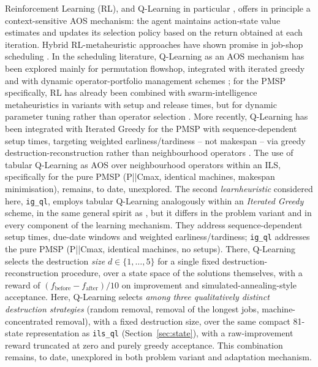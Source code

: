 \documentclass[final,3p,times,11pt,authoryear]{elsarticle}
\begin{document}
Reinforcement Learning (RL), and Q-Learning in particular
\citep{WatkinsDayan1992,SuttonBarto2018}, offers in principle a
context-sensitive AOS mechanism: the agent maintains action-state value estimates and
updates its selection policy based on the return obtained at each
iteration.
Hybrid RL-metaheuristic approaches have shown promise in job-shop
scheduling \citep{ParkEtal2021}. In the scheduling literature, Q-Learning as an
AOS mechanism has been explored mainly for permutation flowshop,
integrated with iterated greedy \citep{KarimiMamaghanEtal2023} and with
dynamic operator-portfolio management schemes
\citep{KarimiMamaghanEtal2024}; for the PMSP specifically, RL has
already been combined with swarm-intelligence metaheuristics in
variants with setup and release times, but for dynamic parameter
tuning rather than operator selection \citep{Ozsoydan2025}. More
recently, Q-Learning has been integrated with
Iterated Greedy for the PMSP with sequence-dependent setup times,
targeting weighted earliness/tardiness -- not makespan -- via greedy
destruction-reconstruction rather than neighbourhood operators
\citep{MissaouiOSullivan2026}. The use of tabular Q-Learning as AOS
over neighbourhood operators within an ILS, specifically for the pure
PMSP (P||Cmax, identical machines, makespan minimisation), remains, to
date, unexplored.
The second \emph{learnheuristic} considered here, \texttt{ig\_ql}, employs
tabular Q-Learning analogously within an \emph{Iterated Greedy} scheme,
in the same general spirit as \citet{MissaouiOSullivan2026}, but it
differs in the problem variant and in every component of the learning
mechanism. They address sequence-dependent setup times, due-date windows
and weighted earliness/tardiness; \texttt{ig\_ql} addresses the pure
PMSP (P||Cmax, identical machines, no setups). There, Q-Learning selects
the destruction \emph{size} $d \in \{1,\ldots,5\}$ for a single fixed
destruction-reconstruction procedure, over a state space of the
solutions themselves, with a reward of
$(f_{\mathrm{before}} - f_{\mathrm{after}})/10$ on improvement and
simulated-annealing-style acceptance. Here, Q-Learning selects
\emph{among three qualitatively distinct destruction strategies}
(random removal, removal of the longest jobs, machine-concentrated
removal), with a fixed destruction size, over the same compact 81-state
representation as \texttt{ils\_ql} (Section~\ref{sec:state}), with a
raw-improvement reward truncated at zero and purely greedy acceptance.
This combination remains, to date, unexplored in both problem variant
and adaptation mechanism.
\end{document}
